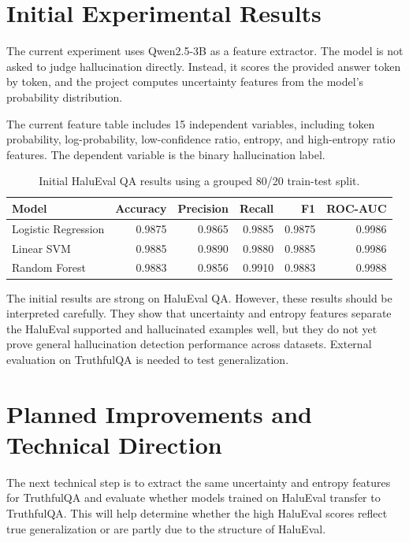 \documentclass[11pt]{article}
\begin{document}
\section{Initial Experimental Results}

The current experiment uses Qwen2.5-3B as a feature extractor. The model is not asked to judge hallucination directly. Instead, it scores the provided answer token by token, and the project computes uncertainty features from the model's probability distribution.

The current feature table includes 15 independent variables, including token probability, log-probability, low-confidence ratio, entropy, and high-entropy ratio features. The dependent variable is the binary hallucination label.

\begin{table}[h]
\centering
\begin{tabular}{lrrrrr}
\toprule
Model & Accuracy & Precision & Recall & F1 & ROC-AUC \\
\midrule
Logistic Regression & 0.9875 & 0.9865 & 0.9885 & 0.9875 & 0.9986 \\
Linear SVM & 0.9885 & 0.9890 & 0.9880 & 0.9885 & 0.9986 \\
Random Forest & 0.9883 & 0.9856 & 0.9910 & 0.9883 & 0.9988 \\
\bottomrule
\end{tabular}
\caption{Initial HaluEval QA results using a grouped 80/20 train-test split.}
\end{table}

The initial results are strong on HaluEval QA. However, these results should be interpreted carefully. They show that uncertainty and entropy features separate the HaluEval supported and hallucinated examples well, but they do not yet prove general hallucination detection performance across datasets. External evaluation on TruthfulQA is needed to test generalization.

\section{Planned Improvements and Technical Direction}

The next technical step is to extract the same uncertainty and entropy features for TruthfulQA and evaluate whether models trained on HaluEval transfer to TruthfulQA. This will help determine whether the high HaluEval scores reflect true generalization or are partly due to the structure of HaluEval.
\end{document}
